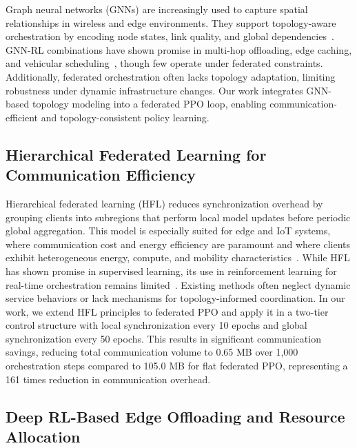 \documentclass[conference]{IEEEtran}
\begin{document}
		Graph neural networks (GNNs) are increasingly used to capture spatial relationships in wireless and edge environments. They support topology-aware orchestration by encoding node states, link quality, and global dependencies~\cite{zhang2024optimizing,jere2023distributed}. GNN-RL combinations have shown promise in multi-hop offloading, edge caching, and vehicular scheduling~\cite{makris2024gnnrl,hao2021urllc}, though few operate under federated constraints. Additionally, federated orchestration often lacks topology adaptation, limiting robustness under dynamic infrastructure changes. Our work integrates GNN-based topology modeling into a federated PPO loop, enabling communication-efficient and topology-consistent policy learning.
		
		
		\subsection{Hierarchical Federated Learning for Communication Efficiency}
		
		Hierarchical federated learning (HFL) reduces synchronization overhead by grouping clients into subregions that perform local model updates before periodic global aggregation. This model is especially suited for edge and IoT systems, where communication cost and energy efficiency are paramount and where clients exhibit heterogeneous energy, compute, and mobility characteristics~\cite{tan2023selfadaptive,huang2022workercentric}. While HFL has shown promise in supervised learning, its use in reinforcement learning for real-time orchestration remains limited~\cite{tam2025graph}. Existing methods often neglect dynamic service behaviors or lack mechanisms for topology-informed coordination. In our work, we extend HFL principles to federated PPO and apply it in a two-tier control structure with local synchronization every 10 epochs and global synchronization every 50 epochs. This results in significant communication savings, reducing total communication volume to 0.65 MB over 1,000 orchestration steps compared to 105.0 MB for flat federated PPO, representing a 161 times reduction in communication overhead.
		
		
		\subsection{Deep RL-Based Edge Offloading and Resource Allocation}
		
\end{document}
